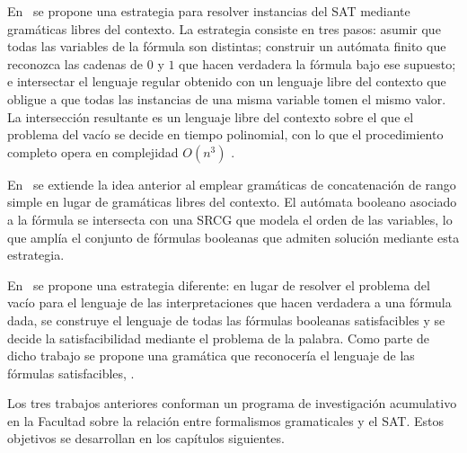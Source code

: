 \documentclass{report}
\theoremstyle{definition}
\theoremstyle{plain}
\theoremstyle{remark}
\begin{document}
En~\cite{fernandez2007sat} se propone una estrategia para resolver
instancias del SAT mediante gramáticas libres del contexto. La
estrategia consiste en tres pasos: asumir que todas las variables de la
fórmula son distintas; construir un autómata finito que reconozca las
cadenas de $0$ y $1$ que hacen verdadera la fórmula bajo ese supuesto;
e intersectar el lenguaje regular obtenido con un lenguaje libre del
contexto que obligue a que todas las instancias de una misma variable
tomen el mismo valor. La intersección resultante es un lenguaje libre
del contexto sobre el que el problema del vacío se decide en tiempo
polinomial, con lo que el procedimiento completo opera en complejidad
$O(n^3)$ .

En~\cite{aguilera2016srcg} se extiende la idea anterior al emplear
gramáticas de concatenación de rango simple en lugar de gramáticas
libres del contexto. El autómata booleano asociado a la fórmula se
intersecta con una SRCG que modela el orden de las variables, lo que
amplía el conjunto de fórmulas booleanas que admiten solución mediante
esta estrategia.

En~\cite{gomez2025sat} se propone una estrategia diferente: en lugar de
resolver el problema del vacío para el lenguaje de las interpretaciones
que hacen verdadera a una fórmula dada, se construye el lenguaje de
todas las fórmulas booleanas satisfacibles y se decide la
satisfacibilidad mediante el problema de la palabra. Como parte de
dicho trabajo se propone una gramática que reconocería el lenguaje de
las fórmulas satisfacibles, .

Los tres trabajos anteriores conforman un programa de investigación
acumulativo en la Facultad sobre la relación entre formalismos
gramaticales y el SAT.  Estos
objetivos se desarrollan en los capítulos siguientes.



\end{document}
